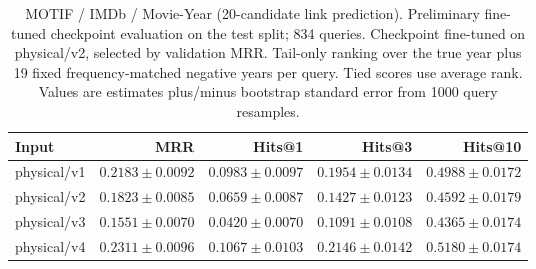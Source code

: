 \begin{table}[t]
\centering
\small
\begin{tabular}{lrrrr}
\toprule
Input & MRR & Hits@1 & Hits@3 & Hits@10 \\
\midrule
physical/v1 & $0.2183 \pm 0.0092$ & $0.0983 \pm 0.0097$ & $0.1954 \pm 0.0134$ & $0.4988 \pm 0.0172$ \\
physical/v2 & $0.1823 \pm 0.0085$ & $0.0659 \pm 0.0087$ & $0.1427 \pm 0.0123$ & $0.4592 \pm 0.0179$ \\
physical/v3 & $0.1551 \pm 0.0070$ & $0.0420 \pm 0.0070$ & $0.1091 \pm 0.0108$ & $0.4365 \pm 0.0174$ \\
physical/v4 & $0.2311 \pm 0.0096$ & $0.1067 \pm 0.0103$ & $0.2146 \pm 0.0142$ & $0.5180 \pm 0.0174$ \\
\bottomrule
\end{tabular}
\caption{MOTIF / IMDb / Movie-Year (20-candidate link prediction). Preliminary fine-tuned checkpoint evaluation on the test split; 834 queries. Checkpoint fine-tuned on physical/v2, selected by validation MRR. Tail-only ranking over the true year plus 19 fixed frequency-matched negative years per query. Tied scores use average rank. Values are estimates plus/minus bootstrap standard error from 1000 query resamples.}
\label{tab:motif-movie_year-link_prediction}
\end{table}
